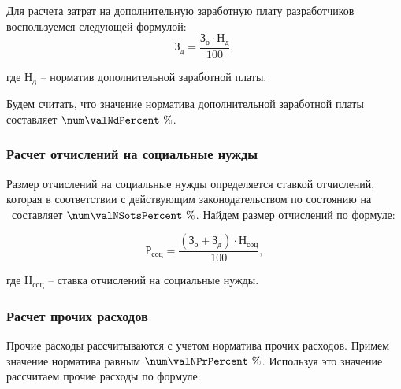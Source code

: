
Для расчета затрат на дополнительную заработную плату разработчиков воспользуемся
следующей формулой:
\begin{equation}
  \label{eq:econ:Zd}
  \text{З}_\text{д} = \frac{\text{З}_\text{о} \cdot \text{Н}_\text{д}}
    {100},
\end{equation}
\begin{explanationx}
  \item[где] $ \text{Н}_\text{д} $ -- норматив дополнительной заработной платы.
\end{explanationx}

Будем считать, что значение норматива дополнительной заработной платы составляет $ \num\valNdPercent \ \% $.


\subsubsection{Расчет отчислений на социальные нужды}


Размер отчислений на социальные нужды определяется ставкой отчислений, которая
в соответствии с действующим законодательством по состоянию на \econCalcDate\
составляет $ \num\valNSotsPercent \ \% $. Найдем размер отчислений по формуле:

\begin{equation}
  \label{eq:econ:RSots}
  \text{Р}_\text{соц} = \frac{(\text{З}_\text{о} + \text{З}_\text{д}) \cdot \text{Н}_\text{соц}}
    {100},
\end{equation}
\begin{explanationx}
  \item[где] $ \text{Н}_\text{соц} $ -- ставка отчислений на социальные нужды.
\end{explanationx}


\subsubsection{Расчет прочих расходов}


Прочие расходы рассчитываются с учетом норматива прочих расходов.
Примем значение норматива равным $ \num\valNPrPercent \ \% $.
Используя это значение рассчитаем прочие расходы по формуле:

